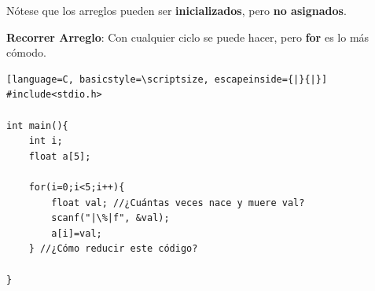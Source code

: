 \documentclass{article}
\begin{document}
\begin{itemize}
\begin{minipage}[h]{0.45\textwidth}
Nótese que los arreglos pueden ser \textbf{inicializados}, pero \textbf{no asignados}.
\end{minipage}
\hspace{0.5cm}
\begin{minipage}[h]{0.45\textwidth}
\item \textbf{Recorrer Arreglo}: Con cualquier ciclo se puede hacer, pero \textbf{for} es lo más cómodo. 
\begin{lstlisting}[language=C, basicstyle=\scriptsize, escapeinside={|}{|}]
#include<stdio.h>

int main(){
	int i;
	float a[5];
	
	for(i=0;i<5;i++){
		float val; //¿Cuántas veces nace y muere val?
		scanf("|\%|f", &val);
		a[i]=val;
	} //¿Cómo reducir este código?

}
\end{lstlisting}
\end{minipage}

\end{itemize}
\end{document}
